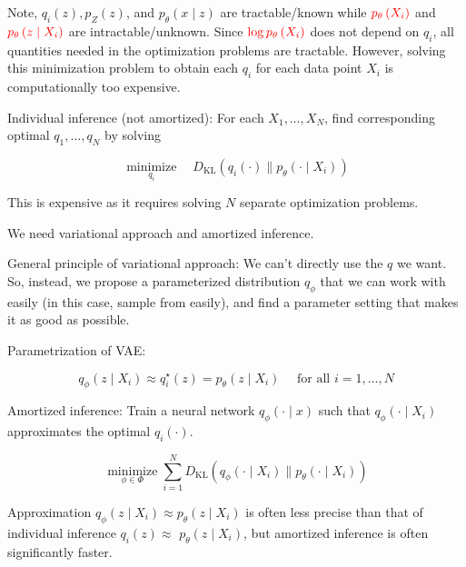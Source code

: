 \documentclass{report}
\begin{document}
\begin{concept}
    Note, $q_{i}(z), p_{Z}(z)$, and $p_{\theta}(x \mid z)$ are tractable/known while $\textcolor{red}{p_{\theta}\left(X_{i}\right)}$ and $\textcolor{red}{p_{\theta}\left(z \mid X_{i}\right)}$ are intractable/unknown. Since $\textcolor{red}{\log p_{\theta}\left(X_{i}\right)}$ does not depend on $q_{i}$, all quantities needed in the optimization problems are tractable. However, solving this minimization problem to obtain each $q_{i}$ for each data point $X_{i}$ is computationally too expensive.

    \par\noindent\textcolor{gray}{\hdashrule{\textwidth}{0.4pt}{1pt 2pt}}

    Individual inference (not amortized): For each $X_{1}, \ldots, X_{N}$, find corresponding optimal $q_{1}, \ldots, q_{N}$ by solving

    $$
    \underset{q_{i}}{\operatorname{minimize}} \quad D_{\mathrm{KL}}\left(q_{i}(\cdot) \| p_{\theta}\left(\cdot \mid X_{i}\right)\right)
    $$

    This is expensive as it requires solving $N$ separate optimization problems.

    We need variational approach and amortized inference.
\end{concept}

\begin{concept}
    General principle of variational approach: We can't directly use the $q$ we want. So, instead, we propose a parameterized distribution $q_{\phi}$ that we can work with easily (in this case, sample from easily), and find a parameter setting that makes it as good as possible.

    Parametrization of VAE:

    $$
    q_{\phi}\left(z \mid X_{i}\right) \approx q_{i}^{\star}(z)=p_{\theta}\left(z \mid X_{i}\right) \quad \text { for all } i=1, \ldots, N
    $$

    Amortized inference: Train a neural network $q_{\phi}(\cdot \mid x)$ such that $q_{\phi}\left(\cdot \mid X_{i}\right)$ approximates the optimal $q_{i}(\cdot)$.

    $$
    \underset{\phi \in \Phi}{\operatorname{minimize}} \sum_{i=1}^{N} D_{\mathrm{KL}}\left(q_{\phi}\left(\cdot \mid X_{i}\right) \| p_{\theta}\left(\cdot \mid X_{i}\right)\right)
    $$

    Approximation $q_{\phi}\left(z \mid X_{i}\right) \approx p_{\theta}\left(z \mid X_{i}\right)$ is often less precise than that of individual inference $q_{i}(z) \approx$ $p_{\theta}\left(z \mid X_{i}\right)$, but amortized inference is often significantly faster.
\end{concept}
\end{document}
